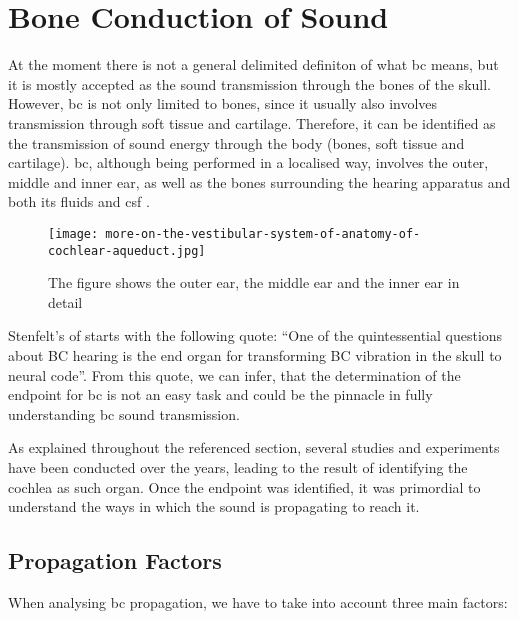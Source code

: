 \section{Bone Conduction of Sound}\label{sec:bonepaths}
At the moment there is not a general delimited definiton of what \gls{bc} means, but it is mostly accepted as the sound transmission through the bones of the skull. However, \gls{bc} is not only limited to bones, since it usually also involves transmission through soft tissue and cartilage. Therefore, it can be identified as the transmission of sound energy through the body (bones, soft tissue and cartilage). 
\gls{bc}, although being performed in a localised way, involves the outer, middle and inner ear, as well as the bones surrounding the hearing apparatus and both its fluids and \gls{csf} \citep{puria_2013}.
 \begin{figure}[H]
	\centering
		\texttt{[image: more-on-the-vestibular-system-of-anatomy-of-cochlear-aqueduct.jpg]}
		\caption{The figure shows the outer ear, the middle ear and the inner ear in detail}
		\label{fig:hearing_system_detail}
\end{figure}
Stenfelt's of \citep[section 6.1.1]{puria_2013} starts with the following quote: \enquote{One of the quintessential questions about BC hearing is the end organ for
transforming BC vibration in the skull to neural code}. From this quote, we can infer, that the determination of the endpoint for \gls{bc} is not an easy task and could be the pinnacle in fully understanding \gls{bc} sound transmission.

As explained throughout the referenced section, several studies and experiments have been conducted over the years, leading to the result of identifying the cochlea as such organ. Once the endpoint was identified, it was primordial to understand the ways in which the sound is propagating to reach it.
\subsection{Propagation Factors}

When analysing \gls{bc} propagation, we have to take into account three main factors:

